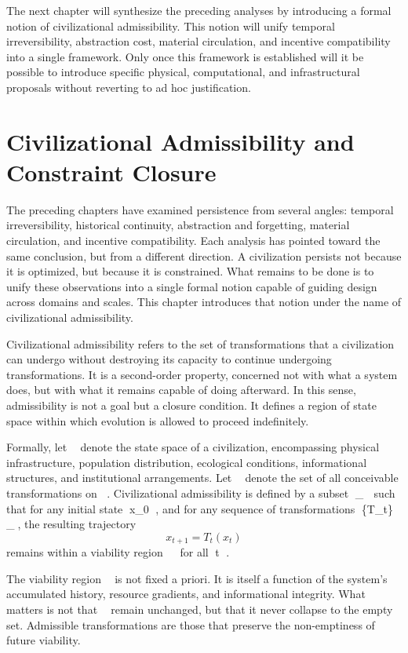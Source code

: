 \documentclass[12pt,oneside]{book}
\begin{document}
The next chapter will synthesize the preceding analyses by introducing a formal notion of civilizational admissibility. This notion will unify temporal irreversibility, abstraction cost, material circulation, and incentive compatibility into a single framework. Only once this framework is established will it be possible to introduce specific physical, computational, and infrastructural proposals without reverting to ad hoc justification.

\chapter{Civilizational Admissibility and Constraint Closure}

The preceding chapters have examined persistence from several angles: temporal irreversibility, historical continuity, abstraction and forgetting, material circulation, and incentive compatibility. Each analysis has pointed toward the same conclusion, but from a different direction. A civilization persists not because it is optimized, but because it is constrained. What remains to be done is to unify these observations into a single formal notion capable of guiding design across domains and scales. This chapter introduces that notion under the name of civilizational admissibility.

Civilizational admissibility refers to the set of transformations that a civilization can undergo without destroying its capacity to continue undergoing transformations. It is a second-order property, concerned not with what a system does, but with what it remains capable of doing afterward. In this sense, admissibility is not a goal but a closure condition. It defines a region of state space within which evolution is allowed to proceed indefinitely.

Formally, let  denote the state space of a civilization, encompassing physical infrastructure, population distribution, ecological conditions, informational structures, and institutional arrangements. Let  denote the set of all conceivable transformations on . Civilizational admissibility is defined by a subset _{} \subset {} such that for any initial state x_0 \in {}, and for any sequence of transformations \{T_t\} \subset {}_{}, the resulting trajectory
\[
x_{t+1} = T_t(x_t)
\]
remains within a viability region  \subset {} for all t .

The viability region  is not fixed a priori. It is itself a function of the system's accumulated history, resource gradients, and informational integrity. What matters is not that  remain unchanged, but that it never collapse to the empty set. Admissible transformations are those that preserve the non-emptiness of future viability.
\end{document}
